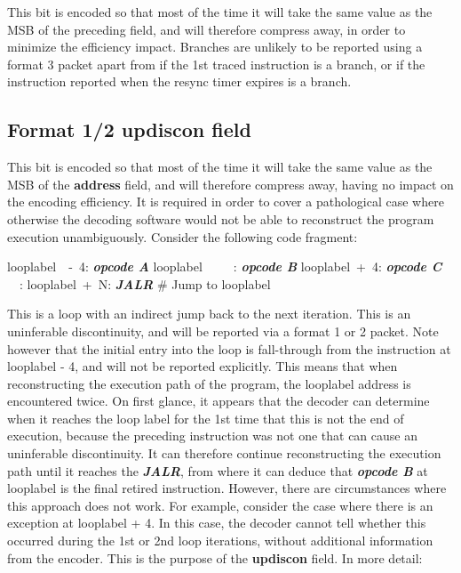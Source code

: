 This bit is encoded so that most of the time it will take the same value as the MSB of the preceding field, and will
therefore compress away, in order to minimize the efficiency impact.  Branches are unlikely to be reported using a
format 3 packet apart from if the 1st traced instruction is a branch, or if the instruction reported when the 
resync timer expires is a branch.

\subsection{Format 1/2 \textbf{updiscon} field}

This bit is encoded so that most of the time it will take the same value as the MSB of the \textbf{address} field,
and will therefore compress away, having no impact on the encoding efficiency.  It is required in order to cover a
pathological case where otherwise the decoding software would not be able to reconstruct the program execution
unambiguously.  Consider the following code fragment:

looplabel~~-~4: \textbf{\textit{opcode A}} \newline
looplabel~~~~~: \textbf{\textit{opcode B}} \newline
looplabel~+~4: \textbf{\textit{opcode C}} \newline
~~: \newline
looplabel~+~N: \textbf{\textit{JALR}} \# Jump to looplabel\newline

This is a loop with an indirect jump back to the next iteration.  This is an uninferable discontinuity, and will be
reported via a format 1 or 2 packet.  Note however that the initial entry into the loop is fall-through from the
instruction at looplabel - 4, and will not be reported explicitly.  This means that when reconstructing the execution 
path of the program, the looplabel address is encountered twice.  On first glance, it appears that the decoder can determine
when it reaches the loop label for the 1st time that this is not the end of execution, because the preceding
instruction was not one that can cause an uninferable discontinuity.  It can therefore continue reconstructing the 
execution path until it reaches the \textbf{\textit{JALR}}, from where it can deduce that \textbf{\textit{opcode B}} at
looplabel is the final retired instruction.  However, there are circumstances where this approach 
does not work.  For example, consider the case where there is an exception at looplabel + 4.  In this case, the decoder
cannot tell whether this occurred during the 1st or 2nd loop iterations, without additional information from the 
encoder.  This is the purpose of the \textbf{updiscon} field.  In more detail:

